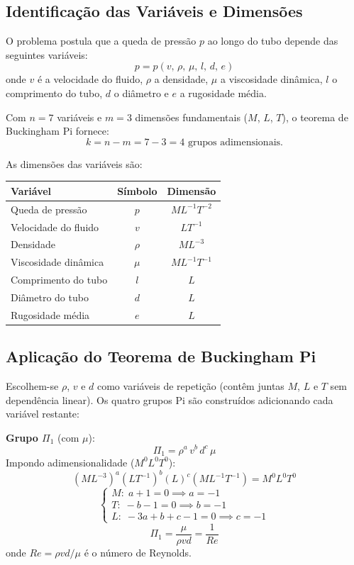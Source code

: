 \subsection*{Identificação das Variáveis e Dimensões}

O problema postula que a queda de pressão $p$ ao longo do tubo depende das seguintes variáveis:
\[
p = p(v,\,\rho,\,\mu,\,l,\,d,\,e)
\]
onde $v$ é a velocidade do fluido, $\rho$ a densidade, $\mu$ a viscosidade dinâmica, $l$ o comprimento do tubo, $d$ o diâmetro e $e$ a rugosidade média.

Com $n = 7$ variáveis e $m = 3$ dimensões fundamentais ($M$, $L$, $T$), o teorema de Buckingham Pi fornece:
\[
k = n - m = 7 - 3 = 4 \text{ grupos adimensionais.}
\]

As dimensões das variáveis são:
\begin{table}[h!]
\centering
\begin{tabular}{lcc}
\toprule
\textbf{Variável} & \textbf{Símbolo} & \textbf{Dimensão} \\\midrule
Queda de pressão & $p$ & $M L^{-1} T^{-2}$ \\
Velocidade do fluido & $v$ & $L T^{-1}$ \\
Densidade & $\rho$ & $M L^{-3}$ \\
Viscosidade dinâmica & $\mu$ & $M L^{-1} T^{-1}$ \\
Comprimento do tubo & $l$ & $L$ \\
Diâmetro do tubo & $d$ & $L$ \\
Rugosidade média & $e$ & $L$ \\\bottomrule
\end{tabular}
\end{table}

\subsection*{Aplicação do Teorema de Buckingham Pi}

Escolhem-se $\rho$, $v$ e $d$ como variáveis de repetição (contêm juntas $M$, $L$ e $T$ sem dependência linear). Os quatro grupos Pi são construídos adicionando cada variável restante:

\textbf{Grupo $\Pi_1$} (com $\mu$):
\[
\Pi_1 = \rho^a\, v^b\, d^c\, \mu
\]
Impondo adimensionalidade ($M^0 L^0 T^0$):
\[
(M L^{-3})^a (L T^{-1})^b (L)^c (M L^{-1} T^{-1}) = M^0 L^0 T^0
\]
\[
\begin{cases} M:\; a + 1 = 0 \implies a = -1 \\ T:\; -b - 1 = 0 \implies b = -1 \\ L:\; -3a + b + c - 1 = 0 \implies c = -1 \end{cases}
\]
\[
\Pi_1 = \frac{\mu}{\rho v d} = \frac{1}{Re}
\]
onde $Re = \rho v d / \mu$ é o número de Reynolds.

